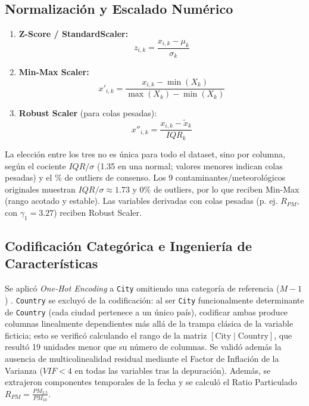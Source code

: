 \documentclass[journal,twocolumn,spanish]{IEEEtran}
\begin{document}
\subsection{Normalización y Escalado Numérico}
\begin{enumerate}
    \item \textbf{Z-Score / StandardScaler:}
    \begin{equation}
    z_{i,k} = \frac{x_{i,k} - \mu_k}{\sigma_k}
    \end{equation}
    \item \textbf{Min-Max Scaler:}
    \begin{equation}
    x'_{i,k} = \frac{x_{i,k} - \min(X_k)}{\max(X_k) - \min(X_k)}
    \end{equation}
    \item \textbf{Robust Scaler} (para colas pesadas):
    \begin{equation}
    x''_{i,k} = \frac{x_{i,k} - \tilde{x}_k}{IQR_k}
    \end{equation}
\end{enumerate}
La elección entre los tres no es única para todo el dataset, sino por columna, según el cociente $IQR/\sigma$ (1.35 en una normal; valores menores indican colas pesadas) y el \% de outliers de consenso. Los 9 contaminantes/meteorológicos originales muestran $IQR/\sigma \approx 1.73$ y $0\%$ de outliers, por lo que reciben Min-Max (rango acotado y estable). Las variables derivadas con colas pesadas (p. ej. $R_{PM}$, con $\gamma_1 = 3.27$) reciben Robust Scaler.

\subsection{Codificación Categórica e Ingeniería de Características}
Se aplicó \emph{One-Hot Encoding} a \texttt{City} omitiendo una categoría de referencia ($M - 1$) \cite{Wickham2014}. \texttt{Country} se excluyó de la codificación: al ser \texttt{City} funcionalmente determinante de \texttt{Country} (cada ciudad pertenece a un único país), codificar ambas produce columnas linealmente dependientes más allá de la trampa clásica de la variable ficticia; esto se verificó calculando el rango de la matriz $[\text{City} \mid \text{Country}]$, que resultó 19 unidades menor que su número de columnas. Se validó además la ausencia de multicolinealidad residual mediante el Factor de Inflación de la Varianza ($VIF < 4$ en todas las variables tras la depuración). Además, se extrajeron componentes temporales de la fecha y se calculó el Ratio Particulado $R_{PM} = \frac{PM_{2.5}}{PM_{10}}$.
\end{document}
